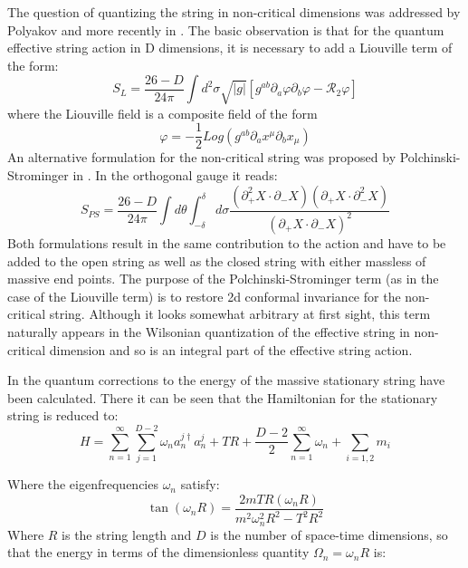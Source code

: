 \documentclass[11pt,a4paper]{article}
\begin{document}
The question of quantizing the string in non-critical dimensions was addressed by Polyakov and more recently in \cite{PS91}\cite{Hellerman13}\cite{Hellerman14}. The basic observation is that for the quantum effective string action in D dimensions, it is necessary to add a Liouville term of the form:
\begin{equation}
S_L=\frac{26-D}{24\pi}\int d^2\sigma\sqrt{|g|}\left[g^{ab}\partial_a\varphi\partial_b\varphi-\mathcal{R}_2\varphi\right]
\end{equation}
where the Liouville field is a composite field of the form
\begin{equation}
\varphi=-\frac{1}{2}Log(g^{ab}\partial_a x^\mu\partial_b x_\mu)
\end{equation}
An alternative formulation for the non-critical string was proposed by Polchinski-Strominger in \cite{PS91}. In the orthogonal gauge it reads:
\begin{equation}
S_{PS}=\frac{26-D}{24\pi}\int d\theta \int_{-\delta}^\delta d\sigma \frac{\left(\partial_{+}^2X\cdot \partial_{-}X\right)\left(\partial_{+}X\cdot \partial_{-}^2X\right)}{\left(\partial_{+}X\cdot \partial_{-}X\right)^2}
\end{equation}
Both formulations result in the same contribution to the action and have to be added to the open string as well as the closed string with either massless of massive end points. The purpose of the Polchinski-Strominger term (as in the case of the Liouville term) is to restore 2d conformal invariance for the non-critical string. Although it looks somewhat arbitrary at first sight, this term naturally appears in the Wilsonian quantization of the effective string in non-critical dimension and so is an integral part of the effective string action.

In \cite{Lambiase96} the quantum corrections to the energy of the massive stationary string have been calculated. There it can be seen that the Hamiltonian for the stationary string is reduced to:
\begin{equation}
H=\sum_{n=1}^{\infty}\sum_{j=1}^{D-2}\omega_na_n^{j\dagger}a_n^j+TR+\frac{D-2}{2}\sum_{n=1}^\infty \omega_n+\sum_{i=1,2} m_i
\end{equation}

Where the eigenfrequencies $\omega_n$ satisfy:
\begin{equation}
\tan\left(\omega_nR\right)=\frac{2mTR\left(\omega_nR\right)}{m^2\omega_n^2R^2-T^2R^2}
\end{equation}
Where $R$ is the string length and $D$ is the number of space-time dimensions, so that the energy in terms of the dimensionless quantity $\Omega_n=\omega_n R$ is:
\end{document}
